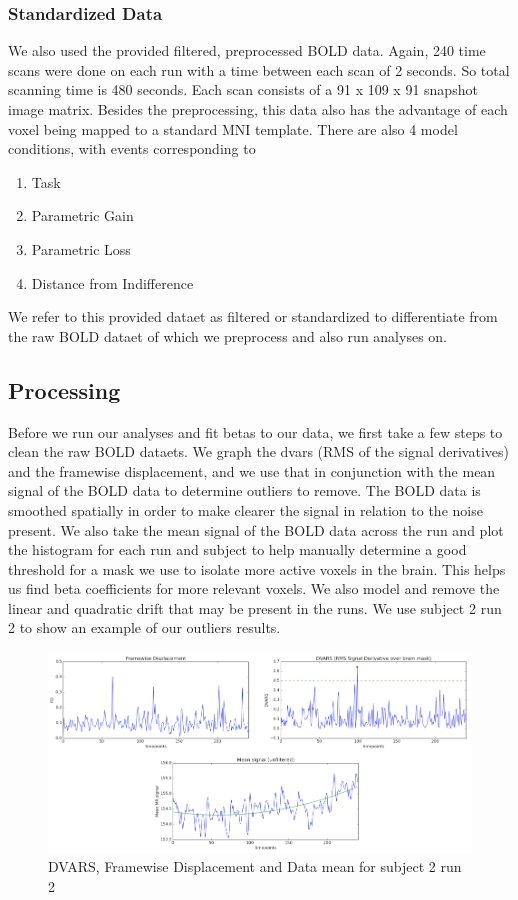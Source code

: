\documentclass[11pt]{article}
\begin{document}
\subsubsection{Standardized Data}
We also used the provided filtered, preprocessed BOLD data. Again, 240 time scans 
were done on each run with a time between each scan of 2 seconds. So total scanning 
time is 480 seconds. Each scan consists of a 91 x 109 x 91 snapshot image
matrix. Besides the preprocessing, this data also has the advantage of each 
voxel being mapped to a standard MNI template. There are also 4 model 
conditions, with events corresponding to 
\begin{enumerate}
  \item Task
  \item Parametric Gain
  \item Parametric Loss
  \item Distance from Indifference
\end{enumerate}
We refer to this provided dataet as filtered or standardized to differentiate from the raw
BOLD dataet of which we preprocess and also run analyses on.

\subsection{Processing}
Before we run our analyses and fit betas to our data, we first take a few 
steps to clean the raw BOLD dataets. We graph the dvars (RMS of the signal 
derivatives) and the framewise displacement, and we use that in conjunction 
with the mean signal of the BOLD data to determine outliers to remove. The 
BOLD data is smoothed spatially in order to make clearer the signal in 
relation to the noise present. We also take the mean signal of the BOLD data 
across the run and plot the histogram for each run and subject to help 
manually determine a good threshold for a mask we use to isolate more active 
voxels in the brain. This helps us find beta coefficients for more relevant 
voxels. We also model and remove the linear and quadratic drift that may be 
present in the runs. 
We use subject 2 run 2 to show an example of our outliers results.

\begin{figure}[H]
    \centering
        \includegraphics[scale=0.55]{figures/processing.png}
    \caption{DVARS, Framewise Displacement and Data mean for subject 2 run 2}
\end{figure}
\end{document}
